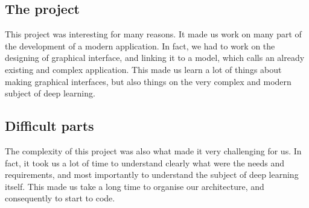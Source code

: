 \subsection{The project}
This project was interesting for many reasons. It made us work on many part of the development of a modern application. In fact, we had to work on the designing of graphical interface, and linking it to a model, which calls an already existing and complex application.
This made us learn a lot of things about making graphical interfaces, but also things on the very complex and modern subject of deep learning.

\subsection{Difficult parts}

The complexity of this project was also what made it very challenging for us. In fact, it took us a lot of time to understand clearly what were the needs and requirements, and most importantly to understand the subject of deep learning itself. This made us take a long time to organise our architecture, and consequently to start to code.